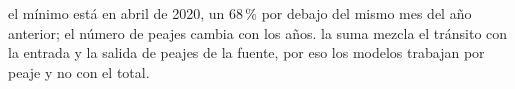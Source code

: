 {el mínimo está en abril de 2020, un 68\,\% por debajo del mismo mes del año anterior; el número de peajes cambia con los años.}
{la suma mezcla el tránsito con la entrada y la salida de peajes de la fuente, por eso los modelos trabajan por peaje y no con el total.}
